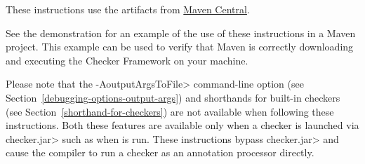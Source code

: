 These instructions use the artifacts from
\href{http://search.maven.org/#search\%7Cga\%7C1\%7Corg.checkerframework}{Maven Central}.

See the demonstration  for an example of the use of
these instructions in a Maven project.  This example can be used to verify that
Maven is correctly downloading and executing the Checker Framework on your machine.

Please note that the \<-AoutputArgsToFile> command-line option
(see Section~\ref{debugging-options-output-args}) and shorthands for built-in checkers
(see Section~\ref{shorthand-for-checkers}) are not available when
following these instructions.  Both these features are available only when a checker is
launched via \<checker.jar> such as when 
is run.  These instructions bypass \<checker.jar> and cause the compiler to run a
checker as an annotation processor directly.

